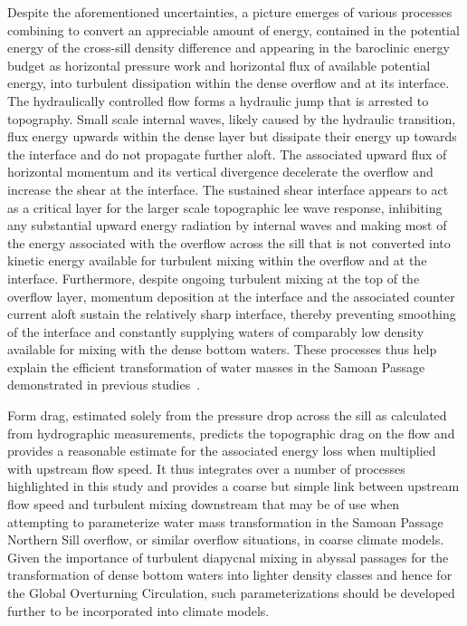 \documentclass{ametsocV6.1}
\begin{document}
Despite the aforementioned uncertainties, a picture emerges of various processes combining to convert an appreciable amount of energy, contained in the potential energy of the cross-sill density difference and appearing in the baroclinic energy budget as horizontal pressure work and horizontal flux of available potential energy, into turbulent dissipation within the dense overflow and at its interface.
The hydraulically controlled flow forms a hydraulic jump that is arrested to topography. 
Small scale internal waves, likely caused by the hydraulic transition, flux energy upwards within the dense layer but dissipate their energy up towards the interface and do not propagate further aloft.
The associated upward flux of horizontal momentum and its vertical divergence decelerate the overflow and increase the shear at the interface.
The sustained shear interface appears to act as a critical layer for the larger scale topographic lee wave response, inhibiting any substantial upward energy radiation by internal waves and making most of the energy associated with the overflow across the sill that is not converted into kinetic energy available for turbulent mixing within the overflow and at the interface.
Furthermore, despite ongoing turbulent mixing at the top of the overflow layer, momentum deposition at the interface and the associated counter current aloft sustain the relatively sharp interface, thereby preventing smoothing of the interface and constantly supplying waters of comparably low density available for mixing with the dense bottom waters.
These processes thus help explain the efficient transformation of water masses in the Samoan Passage demonstrated in previous studies~\citep[e.g.][]{voetetal15}.

Form drag, estimated solely from the pressure drop across the sill as calculated from hydrographic measurements, predicts the topographic drag on the flow and provides a reasonable estimate for the associated energy loss when multiplied with upstream flow speed.
It thus integrates over a number of processes highlighted in this study and provides a coarse but simple link between upstream flow speed and turbulent mixing downstream that may be of use when attempting to parameterize water mass transformation in the Samoan Passage Northern Sill overflow, or similar overflow situations, in coarse climate models.
Given the importance of turbulent diapycnal mixing in abyssal passages for the transformation of dense bottom waters into lighter density classes \citep{brydennurser03, delavergneetal16a, delavergneetal16, prattetal19} and hence for the Global Overturning Circulation, such parameterizations should be developed further to be incorporated into climate models.
\end{document}
